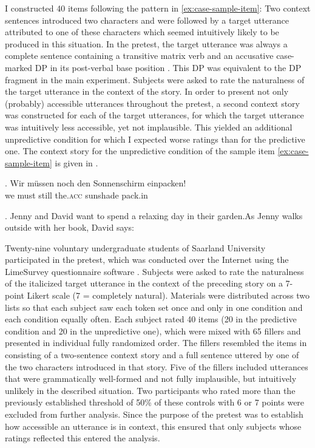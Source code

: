 I constructed 40 items following the pattern in \ref{ex:case-sample-item}: Two context sentences introduced two characters and were followed by a target utterance attributed to one of these characters which seemed intuitively likely to be produced in this situation. In the pretest, the target utterance was always a complete sentence containing a transitive matrix verb and an accusative case-marked DP in its post-verbal base position \Next. This DP was equivalent to the DP fragment in the main experiment. Subjects were asked to rate the naturalness of the target utterance in the context of the story. In order to present not only (probably) accessible utterances throughout the pretest, a second context story was constructed for each of the target utterances, for which the target utterance was intuitively less accessible, yet not implausible. This yielded an additional unpredictive condition for which I expected worse ratings than for the predictive one. The context story for the unpredictive condition of the sample item \ref{ex:case-sample-item} is given in \NNext.\largerpage

\exg. Wir müssen noch den Sonnenschirm einpacken!\\ 
we must still the.\textsc{acc} sunshade pack.in\\

\ex. Jenny and David want to spend a relaxing day in their garden.\linebreak As Jenny walks outside with her book, David says:

Twenty-nine voluntary undergraduate students of Saarland University participated in the pretest, which was conducted over the Internet using the LimeSurvey questionnaire software \citep{limesurveygmbh2012}. Subjects were asked to rate the naturalness of the italicized target utterance in the context of the preceding story on a 7-point Likert scale (7 = completely natural). Materials were distributed across two lists so that each subject saw each token set once and only in one condition and each condition equally often. Each subject rated 40 items (20 in the predictive condition and 20 in the unpredictive one), which were mixed with 65 fillers and presented in individual fully randomized order. The fillers resembled the items in consisting of a two-sentence context story and a full sentence uttered by one of the two characters introduced in that story. Five of the fillers included utterances that were grammatically well-formed and not fully implausible, but intuitively unlikely in the described situation. Two participants who rated more than the previously established threshold of 50\% of these controls with 6 or 7 points were excluded from further analysis. Since the purpose of the pretest was to establish how accessible an utterance is in context, this ensured that only subjects whose ratings reflected this entered the analysis.

